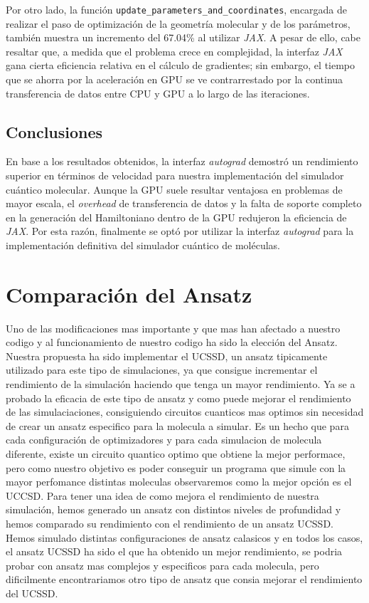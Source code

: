 Por otro lado, la función \texttt{update\_parameters\_and\_coordinates}, encargada de realizar el paso de optimización de la geometría molecular y de los parámetros, también muestra un incremento del 67.04\% al utilizar \textit{JAX}. A pesar de ello, cabe resaltar que, a medida que el problema crece en complejidad, la interfaz \textit{JAX} gana cierta eficiencia relativa en el cálculo de gradientes; sin embargo, el tiempo que se ahorra por la aceleración en GPU se ve contrarrestado por la continua transferencia de datos entre CPU y GPU a lo largo de las iteraciones.

\subsection{Conclusiones}
En base a los resultados obtenidos, la interfaz \textit{autograd} demostró un rendimiento superior en términos de velocidad para nuestra implementación del simulador cuántico molecular. Aunque la GPU suele resultar ventajosa en problemas de mayor escala, el \textit{overhead} de transferencia de datos y la falta de soporte completo en la generación del Hamiltoniano dentro de la GPU redujeron la eficiencia de \textit{JAX}. Por esta razón, finalmente se optó por utilizar la interfaz \textit{autograd} para la implementación definitiva del simulador cuántico de moléculas.

\section{Comparación del Ansatz}
Uno de las modificaciones mas importante y que mas han afectado a nuestro codigo y al funcionamiento de nuestro codigo ha sido la elección del Ansatz. Nuestra propuesta ha sido implementar el UCSSD, un ansatz tipicamente utilizado para este tipo de simulaciones, ya que consigue incrementar el rendimiento de la simulación haciendo que tenga un mayor rendimiento. Ya se a probado la eficacia de este tipo de ansatz y como puede mejorar el rendimiento de las simulaciaciones, consiguiendo circuitos cuanticos mas optimos sin necesidad de crear un ansatz especifico para la molecula a simular. Es un hecho que para cada configuración de optimizadores y para cada simulacion de molecula diferente, existe un circuito quantico optimo que obtiene la mejor performace, pero como nuestro objetivo es poder conseguir un programa que simule con la mayor perfomance distintas moleculas observaremos como la mejor opción es el UCCSD. Para tener una idea de como mejora el rendimiento de nuestra simulación, hemos generado un ansatz con distintos niveles de profundidad y hemos comparado su rendimiento con el rendimiento de un ansatz UCSSD. Hemos simulado distintas configuraciones de ansatz calasicos y en todos los casos, el ansatz UCSSD ha sido el que ha obtenido un mejor rendimiento, se podria probar con ansatz mas complejos y especificos para cada molecula, pero dificilmente encontrariamos otro tipo de ansatz que consia mejorar el rendimiento del UCSSD.

